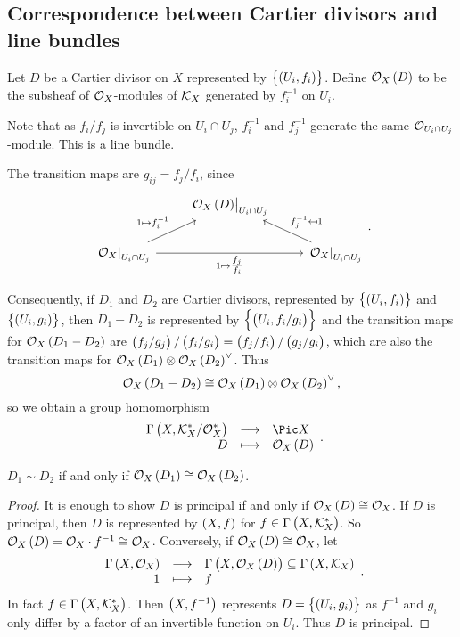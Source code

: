 \subsection{Correspondence between Cartier divisors and line bundles}

\begin{definition*}
Let $ D $ be a Cartier divisor on $ X $ represented by $ \cbr{\br{U_i, f_i}} $. Define $ \OOO_X\br{D} $ to be the subsheaf of $ \mathcal{O}_X $-modules of $ \mathcal{K}_X $ generated by $ f_i^{-1} $ on $ U_i $.
\end{definition*}

Note that as $ f_i / f_j $ is invertible on $ U_i \cap U_j $, $ f_i^{-1} $ and $ f_j^{-1} $ generate the same $ \mathcal{O}_{U_i \cap U_j} $-module. This is a line bundle.

\begin{remark*}
The transition maps are $ g_{ij} = f_j / f_i $, since
$$
\begin{tikzcd}
& \eval{\OOO_X\br{D}}_{U_i \cap U_j} & \\
\eval{\OOO_X}_{U_i \cap U_j} \arrow{ur}{1 \mapsto f_i^{-1}} \arrow{rr}[swap]{1 \mapsto \tfrac{f_j}{f_i}} & & \eval{\OOO_X}_{U_i \cap U_j} \arrow{ul}[swap]{f_j^{-1} \mapsfrom 1}
\end{tikzcd}.
$$

\pagebreak

Consequently, if $ D_1 $ and $ D_2 $ are Cartier divisors, represented by $ \cbr{\br{U_i, f_i}} $ and $ \cbr{\br{U_i, g_i}} $, then $ D_1 - D_2 $ is represented by $ \cbr{\br{U_i, f_i / g_i}} $ and the transition maps for $ \OOO_X\br{D_1 - D_2} $ are $ \br{f_j / g_j} / \br{f_i / g_i} = \br{f_j / f_i} / \br{g_j / g_i} $, which are also the transition maps for $ \OOO_X\br{D_1} \otimes \OOO_X\br{D_2}^\vee $. Thus
$$ \OOO_X\br{D_1 - D_2} \cong \OOO_X\br{D_1} \otimes \OOO_X\br{D_2}^\vee, $$
so we obtain a group homomorphism
$$ \function{\Gamma\br{X, \KKK_X^* / \OOO_X^*}}{\Pic X}{D}{\OOO_X\br{D}}. $$
\end{remark*}

\begin{lemma}
$ D_1 \sim D_2 $ if and only if $ \OOO_X\br{D_1} \cong \OOO_X\br{D_2} $.
\end{lemma}

\begin{proof}
It is enough to show $ D $ is principal if and only if $ \OOO_X\br{D} \cong \OOO_X $. If $ D $ is principal, then $ D $ is represented by $ \br{X, f} $ for $ f \in \Gamma\br{X, \KKK_X^*} $. So $ \OOO_X\br{D} = \OOO_X \cdot f^{-1} \cong \OOO_X $. Conversely, if $ \OOO_X\br{D} \cong \OOO_X $, let
$$ \function{\Gamma\br{X, \OOO_X}}{\Gamma\br{X, \OOO_X\br{D}} \subseteq \Gamma\br{X, \KKK_X}}{1}{f}. $$
In fact $ f \in \Gamma\br{X, \KKK_X^*} $. Then $ \br{X, f^{-1}} $ represents $ D = \cbr{\br{U_i, g_i}} $ as $ f^{-1} $ and $ g_i $ only differ by a factor of an invertible function on $ U_i $. Thus $ D $ is principal.
\end{proof}

